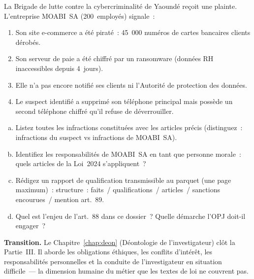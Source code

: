 \begin{boxexo}[title={\ding{45}\quad Exercice~12.3 --- Simulation MOABI \niveauexpert}]
La Brigade de lutte contre la cybercriminalité de Yaoundé reçoit une plainte.
L'entreprise MOABI~SA (200~employés) signale~:
\begin{enumerate}
    \item Son site e-commerce a été piraté~: 45~000 numéros de cartes
          bancaires clients dérobés.
    \item Son serveur de paie a été chiffré par un ransomware
          (données RH inaccessibles depuis 4~jours).
    \item Elle n'a pas encore notifié ses clients ni l'Autorité de
          protection des données.
    \item Le suspect identifié a supprimé son téléphone principal
          mais possède un second téléphone chiffré qu'il refuse de
          déverrouiller.
\end{enumerate}
\begin{enumerate}[(a)]
    \item Listez toutes les infractions constituées avec les articles
          précis (distinguez~: infractions du suspect vs infractions de
          MOABI~SA).
    \item Identifiez les responsabilités de MOABI~SA en tant que personne
          morale~: quels articles de la Loi~2024 s'appliquent~?
    \item Rédigez un rapport de qualification transmissible au parquet
          (une page maximum)~: structure~: faits~/ qualifications~/ articles~/ sanctions encourues~/ mention art.~89.
    \item Quel est l'enjeu de l'art.~88 dans ce dossier~? Quelle démarche
          l'OPJ doit-il engager~?
\end{enumerate}
\end{boxexo}

\bigskip

\begin{boxinfo}
\textbf{Transition.} Le Chapitre~\ref{chap:deon} (Déontologie de
l'investigateur) clôt la Partie~III. Il aborde les obligations éthiques,
les conflits d'intérêt, les responsabilités personnelles et la conduite
de l'investigateur en situation difficile~--- la dimension humaine du
métier que les textes de loi ne couvrent pas.
\end{boxinfo}
